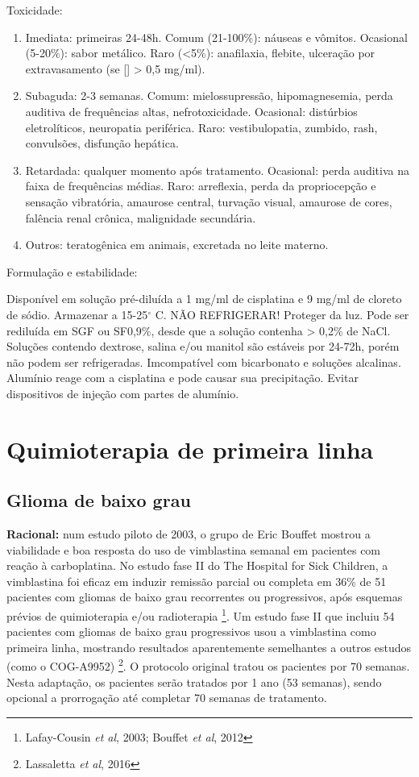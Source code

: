 \documentclass[11pt,a4paper,oldfontcommands]{memoir}
\begin{document}
Toxicidade:
\renewcommand{\labelenumi}{\Alph{enumi}}
\begin{enumerate}
	\item Imediata: primeiras 24-48h. Comum (21-100\%): náuseas e vômitos. Ocasional (5-20\%): sabor metálico. Raro (<5\%): anafilaxia, flebite, ulceração por extravasamento (se [] > 0,5 mg/ml).
	\item Subaguda: 2-3 semanas. Comum: mielossupressão, hipomagnesemia, perda auditiva de frequências altas, nefrotoxicidade. Ocasional: distúrbios eletrolíticos, neuropatia periférica. Raro: vestibulopatia, zumbido, rash, convulsões, disfunção hepática.
	\item Retardada: qualquer momento após tratamento. Ocasional: perda auditiva na faixa de frequências médias. Raro: arreflexia, perda da propriocepção e sensação vibratória, amaurose central, turvação visual, amaurose de cores, falência renal crônica, malignidade secundária.
	\item Outros: teratogênica em animais, excretada no leite materno.
\end{enumerate}

Formulação e estabilidade:

	Disponível em solução pré-diluída a 1 mg/ml de cisplatina e 9 mg/ml de cloreto de sódio. Armazenar a 15-25\(^\circ\) C. NÃO REFRIGERAR! Proteger da luz. Pode ser rediluída em SGF ou SF0,9\%, desde que a solução contenha > 0,2\% de NaCl. Soluções contendo dextrose, salina e/ou manitol são estáveis por 24-72h, porém não podem ser refrigeradas. Imcompatível com bicarbonato e soluções alcalinas. Alumínio reage com a cisplatina e pode causar sua precipitação. Evitar dispositivos de injeção com partes de alumínio. 



\cleardoublepage

\appendix
\chapter{Quimioterapia de primeira linha}
\cleardoublepage

\section{Glioma de baixo grau}
{\let\thefootnote\relax{}}
\textbf{Racional:} num estudo piloto de 2003, o grupo de Eric Bouffet mostrou a viabilidade e boa resposta do uso de vimblastina semanal em pacientes com reação à carboplatina. No estudo fase II do The Hospital for Sick Children, a vimblastina foi eficaz em induzir remissão parcial ou completa em 36\% de 51 pacientes com gliomas de baixo grau recorrentes ou progressivos, após esquemas prévios de quimioterapia e/ou radioterapia \footnote{Lafay-Cousin \textit{et al}, 2003; Bouffet \textit{et al}, 2012}. Um estudo fase II que incluiu 54 pacientes com gliomas de baixo grau progressivos usou a vimblastina como primeira linha, mostrando resultados aparentemente semelhantes a outros estudos (como o COG-A9952) \footnote{Lassaletta \textit{et al}, 2016}. O protocolo original tratou os pacientes por 70 semanas. Nesta adaptação, os pacientes serão tratados por 1 ano (53 semanas), sendo opcional a prorrogação até completar 70 semanas de tratamento.
\end{document}
